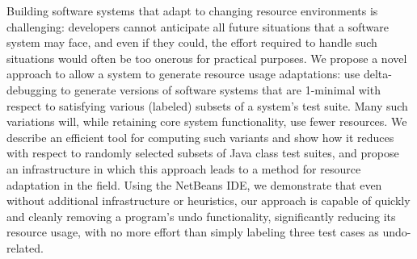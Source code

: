 	Building software systems that adapt to changing resource environments is challenging: developers cannot anticipate all future situations that a software system may face, and even if they could, the effort required to handle such situations would often be too onerous for practical purposes. We propose a novel approach to allow a system to generate resource usage adaptations: use delta-debugging to generate versions of software systems that are 1-minimal with respect to satisfying various (labeled) subsets of a system's test suite. Many such variations will, while retaining core system functionality, use fewer resources. We describe an efficient tool for computing such variants and show how it reduces with respect to randomly selected subsets of Java class test suites, and propose an infrastructure in which this approach leads to a method for resource adaptation in the field. Using the NetBeans IDE, we demonstrate that even without additional infrastructure or heuristics, our approach is capable of quickly and cleanly removing a program's undo functionality, significantly reducing its resource usage, with no more effort than simply labeling three test cases as undo-related.